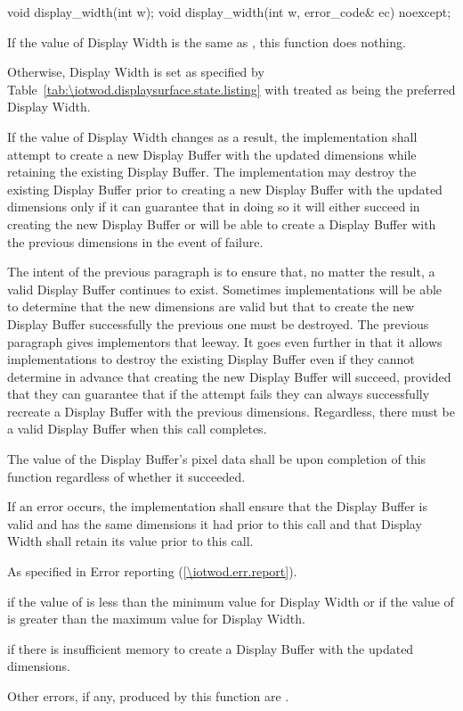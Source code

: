 \begin{itemdecl}
void display_width(int w);
void display_width(int w, error_code& ec) noexcept;
\end{itemdecl}
\begin{itemdescr}
\pnum
\effects
If the value of Display Width is the same as , this function does nothing.

\pnum
Otherwise, Display Width is set as specified by Table~\ref{tab:\iotwod.displaysurface.state.listing} with  treated as being the preferred Display Width.

\pnum
If the value of Display Width changes as a result, the implementation shall attempt to create a new Display Buffer with the updated dimensions while retaining the existing Display Buffer. The implementation may destroy the existing Display Buffer prior to creating a new Display Buffer with the updated dimensions only if it can guarantee that in doing so it will either succeed in creating the new Display Buffer or will be able to create a Display Buffer with the previous dimensions in the event of failure.

\pnum
\begin{note}
The intent of the previous paragraph is to ensure that, no matter the result, a valid Display Buffer continues to exist. Sometimes implementations will be able to determine that the new dimensions are valid but that to create the new Display Buffer successfully the previous one must be destroyed. The previous paragraph gives implementors that leeway. It goes even further in that it allows implementations to destroy the existing Display Buffer even if they cannot determine in advance that creating the new Display Buffer will succeed, provided that they can guarantee that if the attempt fails they can always successfully recreate a Display Buffer with the previous dimensions. Regardless, there must be a valid Display Buffer when this call completes.
\end{note}

\pnum
The value of the Display Buffer's pixel data shall be \unspecnorm upon completion of this function regardless of whether it succeeded.

\pnum
If an error occurs, the implementation shall ensure that the Display Buffer is valid and has the same dimensions it had prior to this call and that Display Width shall retain its value prior to this call.

\pnum
\throws
As specified in Error reporting (\ref{\iotwod.err.report}).

\pnum
\errors
{} if the value of  is less than the minimum value for Display Width or if the value of  is greater than the maximum value for Display Width.

 if there is insufficient memory to create a Display Buffer with the updated dimensions.

Other errors, if any, produced by this function are .
\end{itemdescr}

